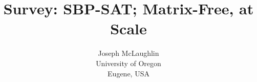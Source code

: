 \title{Survey: SBP-SAT; Matrix-Free, at Scale }
\author{Joseph McLaughlin \\
        University of Oregon \\ 
        Eugene, USA}